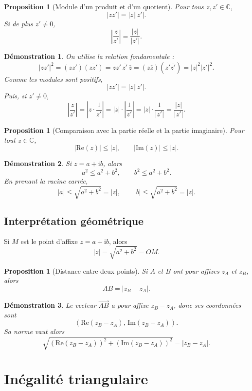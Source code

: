 \documentclass[11pt,a4paper]{article}
\newtheorem{proposition}[definition]{Proposition}
\newtheorem*{demonstration}{Démonstration}
\newcommand{\C}{\mathbb{C}}
\newcommand{\ii}{\mathrm{i}}
\newcommand{\Ree}{\mathrm{Re}}
\newcommand{\Imm}{\mathrm{Im}}
\begin{document}
\begin{proposition}[Module d'un produit et d'un quotient]
Pour tous $z,z'\in \C$,
\[
|zz'|=|z||z'|.
\]
Si de plus $z'\neq 0$,
\[
\left|\frac{z}{z'}\right|=\frac{|z|}{|z'|}.
\]
\end{proposition}

\begin{demonstration}
On utilise la relation fondamentale :
\[
|zz'|^2=(zz')\overline{(zz')}=zz'\,\overline{z'}\,\overline{z}
=(z\overline{z})(z'\overline{z'})=|z|^2|z'|^2.
\]
Comme les modules sont positifs,
\[
|zz'|=|z||z'|.
\]
Puis, si $z'\neq 0$,
\[
\left|\frac{z}{z'}\right|
=\left|z\cdot \frac1{z'}\right|
=|z|\cdot \left|\frac1{z'}\right|
=|z|\cdot \frac1{|z'|}
=\frac{|z|}{|z'|}.
\]
\end{demonstration}

\begin{proposition}[Comparaison avec la partie réelle et la partie imaginaire]
Pour tout $z\in \C$,
\[
|\Ree(z)|\leq |z|,
\qquad
|\Imm(z)|\leq |z|.
\]
\end{proposition}

\begin{demonstration}
Si $z=a+\ii b$, alors
\[
a^2\leq a^2+b^2,
\qquad
b^2\leq a^2+b^2.
\]
En prenant la racine carrée,
\[
|a|\leq \sqrt{a^2+b^2}=|z|,
\qquad
|b|\leq \sqrt{a^2+b^2}=|z|.
\]
\end{demonstration}

\subsection{Interprétation géométrique}

Si $M$ est le point d'affixe $z=a+\ii b$, alors
\[
|z|=\sqrt{a^2+b^2}=OM.
\]

\begin{proposition}[Distance entre deux points]
Si $A$ et $B$ ont pour affixes $z_A$ et $z_B$, alors
\[
AB=|z_B-z_A|.
\]
\end{proposition}

\begin{demonstration}
Le vecteur $\overrightarrow{AB}$ a pour affixe $z_B-z_A$, donc ses coordonnées sont
\[
(\Ree(z_B-z_A),\, \Imm(z_B-z_A)).
\]
Sa norme vaut alors
\[
\sqrt{(\Ree(z_B-z_A))^2+(\Imm(z_B-z_A))^2}=|z_B-z_A|.
\]
\end{demonstration}

\section{Inégalité triangulaire}
\end{document}
